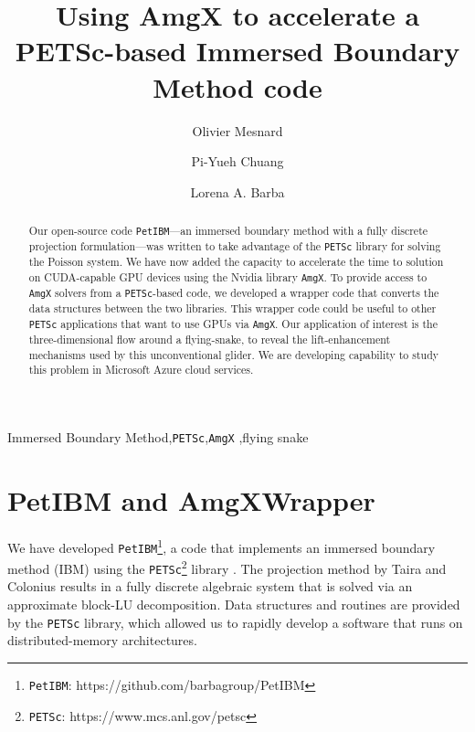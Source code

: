 \documentclass[preprint, 1p]{elsarticle}
\begin{document}
\begin{frontmatter}

\title{Using AmgX to accelerate a PETSc-based Immersed Boundary Method code}

\address[gwu]{Mechanical and Aerospace Engineering, The George Washington University, \\
Washington, DC, 20052, United-States}
\author[gwu]{Olivier Mesnard}
\author[gwu]{Pi-Yueh Chuang}
\author[gwu]{Lorena A. Barba}


\begin{abstract}
Our open-source code \texttt{PetIBM}---an immersed boundary method with a fully discrete projection formulation---was written to take advantage of the \texttt{PETSc} library for solving the Poisson system. 
We have now added the capacity to accelerate the time to solution on CUDA-capable GPU devices using the Nvidia library \texttt{AmgX}. 
To provide access to \texttt{AmgX} solvers from a \texttt{PETSc}-based code, we developed a wrapper code that converts the data structures between the two libraries.
This wrapper code could be useful to other \texttt{PETSc} applications that want to use GPUs via \texttt{AmgX}.
Our application of interest is the three-dimensional flow around a  flying-snake,  to reveal the lift-enhancement mechanisms used by this unconventional glider.
We are developing capability to study this problem in Microsoft Azure cloud services.
\end{abstract}

\begin{keyword}
Immersed Boundary Method\sep \texttt{PETSc}\sep \texttt{AmgX} \sep flying snake
\end{keyword}

\end{frontmatter}

\linenumbers

\section{PetIBM and AmgXWrapper}

We have developed \texttt{PetIBM}\footnote{\texttt{PetIBM}: https://github.com/barbagroup/PetIBM}, a code that implements an immersed boundary method (IBM) using the \texttt{PETSc}\footnote{\texttt{PETSc}: https://www.mcs.anl.gov/petsc} library .
The projection method by Taira and Colonius\cite{Taira_Colonius_2007} results in a fully discrete algebraic system that is solved via an approximate block-LU decomposition.
Data structures and routines are provided by the \texttt{PETSc} library, which allowed us to rapidly develop a software that runs on distributed-memory architectures.
\end{document}
